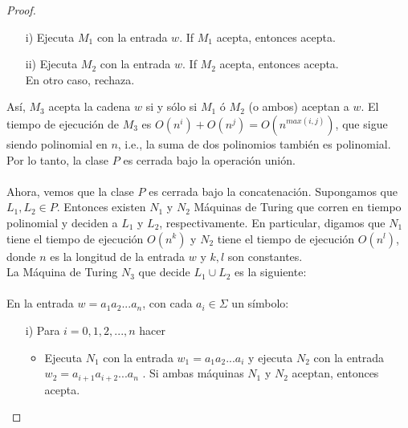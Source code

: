 \documentclass[letterpaper,10pt]{article}
\begin{document}
\begin{enumerate}
\begin{itemize}
\begin{proof}
             \begin{itemize}
                 
                 \item[i)] Ejecuta $M_1$ con la entrada $w$. If $M_1$ acepta, 
                 entonces acepta.
                 \item[ii)] Ejecuta $M_2$ con la entrada $w$. If $M_2$ acepta,
                 entonces acepta. \\
                 En otro caso, rechaza.
                 
             \end{itemize}
             
             Así, $M_3$ acepta la cadena $w$ si y sólo si $M_1$ ó $M_2$
             (o ambos) aceptan a $w$. El tiempo de ejecución de $M_3$ es
             $O(n^{i}) + O(n^{j}) = O(n^{max(i, j)})$, que sigue siendo
             polinomial en $n$, i.e., la suma de dos polinomios también es
             polinomial. Por lo tanto, la clase $P$ es cerrada bajo la 
             operación unión. \\ \\
             Ahora, vemos que la clase $P$ es cerrada bajo la concatenación.
             Supongamos que $L_1, L_2 \in P$. Entonces existen
             $N_1$ y $N_2$ Máquinas de Turing que corren en tiempo 
             polinomial y deciden a $L_1$ y $L_2$, respectivamente. En
             particular, digamos que $N_1$ tiene el tiempo de ejecución
             $O(n^{k})$ y $N_2$ tiene el tiempo de ejecución $O(n^{l})$, donde
             $n$ es la longitud de la entrada $w$ y $k, l$ son constantes. \\
             La Máquina de Turing $N_3$ que decide $L_1 \cup L_2$ es la
             siguiente: \\ \\
             En la entrada $w = a_1a_2...a_n$, con cada $a_i \in \Sigma$ un 
             símbolo:
             
             \begin{itemize}
                 \item[i)] Para $i = 0, 1, 2, ..., n$ hacer
                 
                 \begin{itemize}
                     \item Ejecuta $N_1$ con la entrada $w_1 = a_1a_2...a_i$
                     y ejecuta $N_2$ con la entrada $w_2 = a_{i+1}a_{i+2}...a_n$
                     . Si ambas máquinas $N_1$ y $N_2$ aceptan, entonces
                     acepta.
                 \end{itemize}
                 

\end{itemize}
\end{proof}
\end{itemize}
\end{enumerate}
\end{document}
